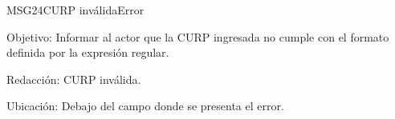 \begin{mensaje}{MSG24}{CURP inválida}{Error}
	\item [Objetivo:] Informar al actor que la CURP ingresada no cumple con el formato definida por la expresión regular.
	\item[Redacción:] CURP inválida.
	\item [Ubicación:] Debajo del campo donde se presenta el error.
\end{mensaje}